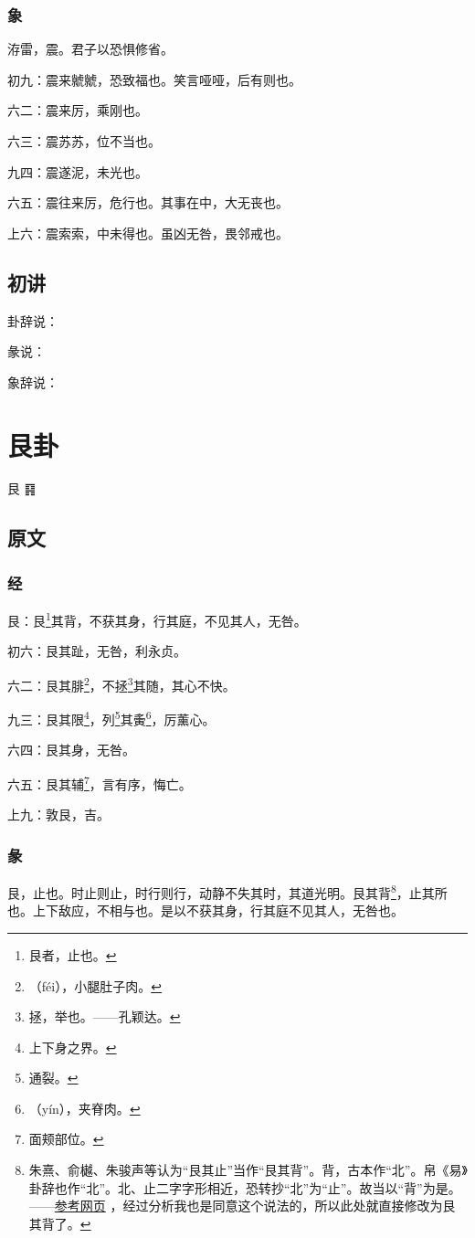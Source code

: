\documentclass[12pt,oneside]{book}
\begin{document}
\subsection{象}
洊雷，震。君子以恐惧修省。

初九：震来虩虩，恐致福也。笑言哑哑，后有则也。

六二：震来厉，乘刚也。

六三：震苏苏，位不当也。

九四：震遂泥，未光也。

六五：震往来厉，危行也。其事在中，大无丧也。

上六：震索索，中未得也。虽凶无咎，畏邻戒也。


\section{初讲}
卦辞说：

彖说：

象辞说：



\chapter{艮卦}
艮 {\Large ䷳}


\section{原文}

\subsection{经}
艮：艮\footnote{艮者，止也。}其背，不获其身，行其庭，不见其人，无咎。

初六：艮其趾，无咎，利永贞。

六二：艮其腓\footnote{（féi），小腿肚子肉。}，不拯\footnote{拯，举也。——孔颖达。}其随，其心不快。

九三：艮其限\footnote{上下身之界。}，列\footnote{通裂。}其夤\footnote{（yín），夹脊肉。}，厉薰心。

六四：艮其身，无咎。

六五：艮其辅\footnote{面颊部位。}，言有序，悔亡。

上九：敦艮，吉。


\subsection{彖}
艮，止也。时止则止，时行则行，动静不失其时，其道光明。艮其背\footnote{朱熹、俞樾、朱骏声等认为“艮其止”当作“艮其背”。背，古本作“北”。帛《易》卦辞也作“北”。北、止二字字形相近，恐转抄“北”为“止”。故当以“背”为是。——\href{https://www.vsucai.cn/yizhuan/content-52.html}{参考网页} ，经过分析我也是同意这个说法的，所以此处就直接修改为艮其背了。}，止其所也。上下敌应，不相与也。是以不获其身，行其庭不见其人，无咎也。
\end{document}
